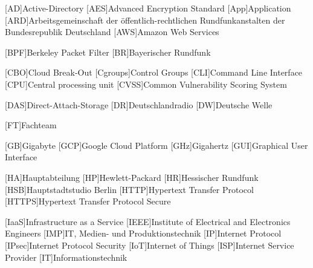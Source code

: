 
\addchap{\langabkverz}
%	
\begin{acronym}[seccomp]
    \setlength{\itemsep}{0pt}
    [AD]{Active-Directory}
    [AES]{Advanced Encryption Standard}
    [App]{Application}
    [ARD]{Arbeitsgemeinschaft der öffentlich-rechtlichen Rundfunkanstalten der Bundesrepublik Deutschland}
    [AWS]{Amazon Web Services}
    
    [BPF]{Berkeley Packet Filter}
    [BR]{Bayerischer Rundfunk}
    
    [CBO]{Cloud Break-Out}
    [Cgroups]{Control Groups}
    [CLI]{Command Line Interface}
    [CPU]{Central processing unit}
    [CVSS]{Common Vulnerability Scoring System}
    
    [DAS]{Direct-Attach-Storage}
    [DR]{Deutschlandradio}
    [DW]{Deutsche Welle}
    
    [FT]{Fachteam}
    
    [GB]{Gigabyte}
    [GCP]{Google Cloud Platform}
    [GHz]{Gigahertz}
    [GUI]{Graphical User Interface}
    
    [HA]{Hauptabteilung}
    [HP]{Hewlett-Packard}
    [HR]{Hessischer Rundfunk}
    [HSB]{Hauptstadtstudio Berlin}
    [HTTP]{Hypertext Transfer Protocol}
    [HTTPS]{Hypertext Transfer Protocol Secure}
    
    [IaaS]{Infrastructure as a Service}
    [IEEE]{Institute of Electrical and Electronics Engineers}
    [IMP]{IT, Medien- und Produktionstechnik}
    [IP]{Internet Protocol}
    [IPsec]{Internet Protocol Security}
    [IoT]{Internet of Things}
    [ISP]{Internet Service Provider}
    [IT]{Informationstechnik}
    

\end{acronym}
